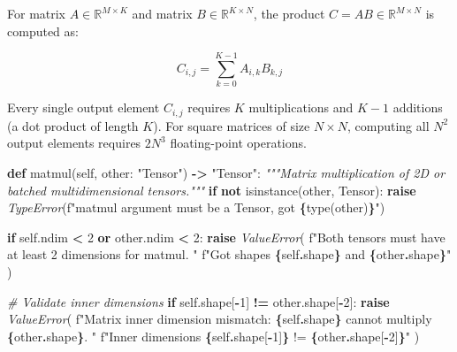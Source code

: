 \documentclass[
  letterpaper,
]{scrbook}
\newenvironment{Shaded}{\begin{snugshade}}{\end{snugshade}}
\newcommand{\BuiltInTok}[1]{#1}
\newcommand{\CommentTok}[1]{\textcolor[rgb]{0.56,0.35,0.01}{\textit{#1}}}
\newcommand{\ControlFlowTok}[1]{\textcolor[rgb]{0.13,0.29,0.53}{\textbf{#1}}}
\newcommand{\DecValTok}[1]{\textcolor[rgb]{0.00,0.00,0.81}{#1}}
\newcommand{\KeywordTok}[1]{\textcolor[rgb]{0.13,0.29,0.53}{\textbf{#1}}}
\newcommand{\NormalTok}[1]{#1}
\newcommand{\OperatorTok}[1]{\textcolor[rgb]{0.81,0.36,0.00}{\textbf{#1}}}
\newcommand{\PreprocessorTok}[1]{\textcolor[rgb]{0.56,0.35,0.01}{\textit{#1}}}
\newcommand{\SpecialCharTok}[1]{\textcolor[rgb]{0.81,0.36,0.00}{\textbf{#1}}}
\newcommand{\SpecialStringTok}[1]{\textcolor[rgb]{0.31,0.60,0.02}{#1}}
\newcommand{\StringTok}[1]{\textcolor[rgb]{0.31,0.60,0.02}{#1}}
\newcommand{\VariableTok}[1]{\textcolor[rgb]{0.00,0.00,0.00}{#1}}
\begin{document}
For matrix \(A \in \mathbb{R}^{M \times K}\) and matrix
\(B \in \mathbb{R}^{K \times N}\), the product
\(C = AB \in \mathbb{R}^{M \times N}\) is computed as:

\[C_{i, j} = \sum_{k=0}^{K-1} A_{i, k} B_{k, j}\]

Every single output element \(C_{i, j}\) requires \(K\) multiplications
and \(K-1\) additions (a dot product of length \(K\)). For square
matrices of size \(N \times N\), computing all \(N^2\) output elements
requires \(2N^3\) floating-point operations.

\begin{Shaded}
\begin{Highlighting}[]
\KeywordTok{def}\NormalTok{ matmul(}\VariableTok{self}\NormalTok{, other: }\StringTok{"Tensor"}\NormalTok{) }\OperatorTok{{-}\textgreater{}} \StringTok{"Tensor"}\NormalTok{:}
    \CommentTok{"""Matrix multiplication of 2D or batched multidimensional tensors."""}
    \ControlFlowTok{if} \KeywordTok{not} \BuiltInTok{isinstance}\NormalTok{(other, Tensor):}
        \ControlFlowTok{raise} \PreprocessorTok{TypeError}\NormalTok{(}\SpecialStringTok{f"matmul argument must be a Tensor, got }\SpecialCharTok{\{}\BuiltInTok{type}\NormalTok{(other)}\SpecialCharTok{\}}\SpecialStringTok{"}\NormalTok{)}

    \ControlFlowTok{if} \VariableTok{self}\NormalTok{.ndim }\OperatorTok{\textless{}} \DecValTok{2} \KeywordTok{or}\NormalTok{ other.ndim }\OperatorTok{\textless{}} \DecValTok{2}\NormalTok{:}
        \ControlFlowTok{raise} \PreprocessorTok{ValueError}\NormalTok{(}
            \SpecialStringTok{f"Both tensors must have at least 2 dimensions for matmul. "}
            \SpecialStringTok{f"Got shapes }\SpecialCharTok{\{}\VariableTok{self}\SpecialCharTok{.}\NormalTok{shape}\SpecialCharTok{\}}\SpecialStringTok{ and }\SpecialCharTok{\{}\NormalTok{other}\SpecialCharTok{.}\NormalTok{shape}\SpecialCharTok{\}}\SpecialStringTok{"}
\NormalTok{        )}

    \CommentTok{\# Validate inner dimensions}
    \ControlFlowTok{if} \VariableTok{self}\NormalTok{.shape[}\OperatorTok{{-}}\DecValTok{1}\NormalTok{] }\OperatorTok{!=}\NormalTok{ other.shape[}\OperatorTok{{-}}\DecValTok{2}\NormalTok{]:}
        \ControlFlowTok{raise} \PreprocessorTok{ValueError}\NormalTok{(}
            \SpecialStringTok{f"Matrix inner dimension mismatch: }\SpecialCharTok{\{}\VariableTok{self}\SpecialCharTok{.}\NormalTok{shape}\SpecialCharTok{\}}\SpecialStringTok{ cannot multiply }\SpecialCharTok{\{}\NormalTok{other}\SpecialCharTok{.}\NormalTok{shape}\SpecialCharTok{\}}\SpecialStringTok{. "}
            \SpecialStringTok{f"Inner dimensions }\SpecialCharTok{\{}\VariableTok{self}\SpecialCharTok{.}\NormalTok{shape[}\OperatorTok{{-}}\DecValTok{1}\NormalTok{]}\SpecialCharTok{\}}\SpecialStringTok{ != }\SpecialCharTok{\{}\NormalTok{other}\SpecialCharTok{.}\NormalTok{shape[}\OperatorTok{{-}}\DecValTok{2}\NormalTok{]}\SpecialCharTok{\}}\SpecialStringTok{"}
\NormalTok{        )}


\end{Highlighting}
\end{Shaded}
\end{document}
